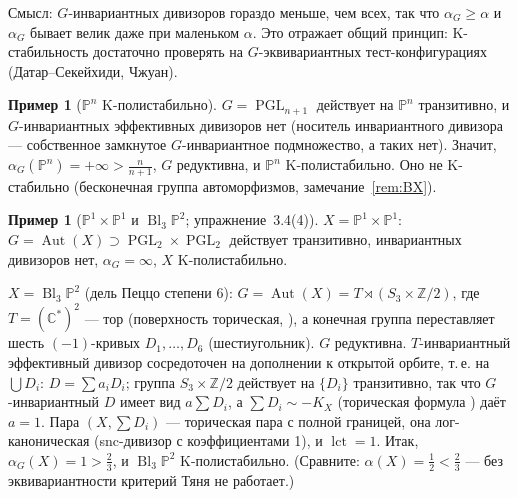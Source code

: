 \documentclass[11pt,a4paper]{article}
\theoremstyle{plain}
\theoremstyle{definition}
\newtheorem{example}[theorem]{Пример}
\theoremstyle{remark}
\renewcommand{\C}{\mathbb{C}}
\newcommand{\Z}{\mathbb{Z}}
\newcommand{\PP}{\mathbb{P}}
\DeclareMathOperator{\Bl}{Bl}
\DeclareMathOperator{\PGL}{PGL}
\DeclareMathOperator{\Aut}{Aut}
\DeclareMathOperator{\lct}{lct}
\begin{document}
Смысл: $G$-инвариантных дивизоров гораздо меньше, чем всех, так что $\alpha_G\ge\alpha$ и
$\alpha_G$ бывает велик даже при маленьком $\alpha$. Это отражает общий принцип: K-стабильность
достаточно проверять на $G$-эквивариантных тест-конфигурациях (Датар--Секейхиди, Чжуан).

\begin{example}[$\PP^n$ K-полистабильно]\label{ex:Pn-polystable}
$G=\PGL_{n+1}$ действует на $\PP^n$ транзитивно, и $G$-инвариантных эффективных дивизоров нет
(носитель инвариантного дивизора --- собственное замкнутое $G$-инвариантное подмножество, а
таких нет). Значит, $\alpha_G(\PP^n)=+\infty>\frac n{n+1}$, $G$ редуктивна, и $\PP^n$ K-полистабильно.
Оно не K-стабильно (бесконечная группа автоморфизмов, замечание~\ref{rem:BX}).
\end{example}

\begin{example}[$\PP^1\times\PP^1$ и $\Bl_3\PP^2$; упражнение~3.4(4)]\label{ex:dP8-dP6-polystable}
\emph{$X=\PP^1\times\PP^1$}: $G=\Aut(X)\supset\PGL_2\times\PGL_2$ действует транзитивно, инвариантных
дивизоров нет, $\alpha_G=\infty$, $X$ K-полистабильно.

\emph{$X=\Bl_3\PP^2$} (дель Пеццо степени 6): $G=\Aut(X)=T\rtimes(S_3\times\Z/2)$, где
$T=(\C^*)^2$ --- тор (поверхность торическая, \cite[4.11(4)]{AG}), а конечная группа переставляет
шесть $(-1)$-кривых $D_1,\dots,D_6$ (шестиугольник). $G$ редуктивна. $T$-инвариантный эффективный
дивизор сосредоточен на дополнении к открытой орбите, т.\,е. на $\bigcup D_i$: $D=\sum a_iD_i$;
группа $S_3\times\Z/2$ действует на $\{D_i\}$ транзитивно, так что $G$-инвариантный $D$ имеет вид
$a\sum D_i$, а $\sum D_i\sim-K_X$ (торическая формула \cite[4.20]{AG}) даёт $a=1$. Пара
$(X,\sum D_i)$ --- торическая пара с полной границей, она лог-каноническая (snc-дивизор с
коэффициентами 1), и $\lct=1$. Итак, $\alpha_G(X)=1>\frac23$, и $\Bl_3\PP^2$ K-полистабильно.
(Сравните: $\alpha(X)=\frac12<\frac23$ --- без эквивариантности критерий Тяня не работает.)
\end{example}
\end{document}
